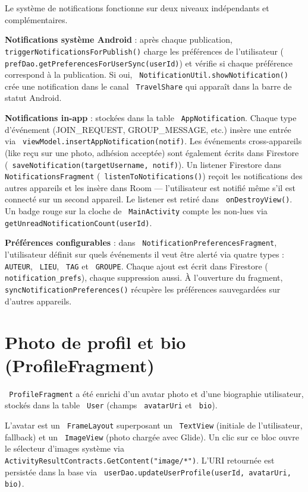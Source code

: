 \documentclass[a4paper,12pt,openany]{report}
\newcommand{\ic}[1]{\texttt{\small\colorbox{lightbg}{\color{navy!90} #1}}}
\begin{document}
Le système de notifications fonctionne sur deux niveaux indépendants et
complémentaires.

\textbf{Notifications système Android} : après chaque publication,
\ic{triggerNotificationsForPublish()} charge les préférences de l'utilisateur
(\ic{prefDao.getPreferencesForUserSync(userId)}) et vérifie si chaque
préférence correspond à la publication. Si oui, \ic{NotificationUtil.showNotification()}
crée une notification dans le canal \ic{TravelShare} qui apparaît dans la
barre de statut Android.

\textbf{Notifications in-app} : stockées dans la table \ic{AppNotification}.
Chaque type d'événement (JOIN\_REQUEST, GROUP\_MESSAGE, etc.) insère une entrée
via \ic{viewModel.insertAppNotification(notif)}. Les événements cross-appareils
(like reçu sur une photo, adhésion acceptée) sont également écrits dans Firestore
(\ic{saveNotification(targetUsername, notif)}). Un listener Firestore dans
\ic{NotificationsFragment} (\ic{listenToNotifications()}) reçoit les notifications
des autres appareils et les insère dans Room — l'utilisateur est notifié même
s'il est connecté sur un second appareil. Le listener est retiré dans \ic{onDestroyView()}.
Un badge rouge sur la cloche de \ic{MainActivity} compte les non-lues via
\ic{getUnreadNotificationCount(userId)}.

\textbf{Préférences configurables} : dans \ic{NotificationPreferencesFragment},
l'utilisateur définit sur quels événements il veut être alerté via quatre types :
\ic{AUTEUR}, \ic{LIEU}, \ic{TAG} et \ic{GROUPE}.
Chaque ajout est écrit dans Firestore (\ic{notification\_prefs}), chaque suppression
aussi. À l'ouverture du fragment, \ic{syncNotificationPreferences()} récupère
les préférences sauvegardées sur d'autres appareils.


\section{Photo de profil et bio (ProfileFragment)}

\ic{ProfileFragment} a été enrichi d'un avatar photo et d'une biographie
utilisateur, stockés dans la table \ic{User} (champs \ic{avatarUri} et \ic{bio}).

L'avatar est un \ic{FrameLayout} superposant un \ic{TextView} (initiale de
l'utilisateur, fallback) et un \ic{ImageView} (photo chargée avec Glide).
Un clic sur ce bloc ouvre le sélecteur d'images système via
\ic{ActivityResultContracts.GetContent("image/*")}. L'URI retournée est persistée
dans la base via \ic{userDao.updateUserProfile(userId, avatarUri, bio)}.
\end{document}
